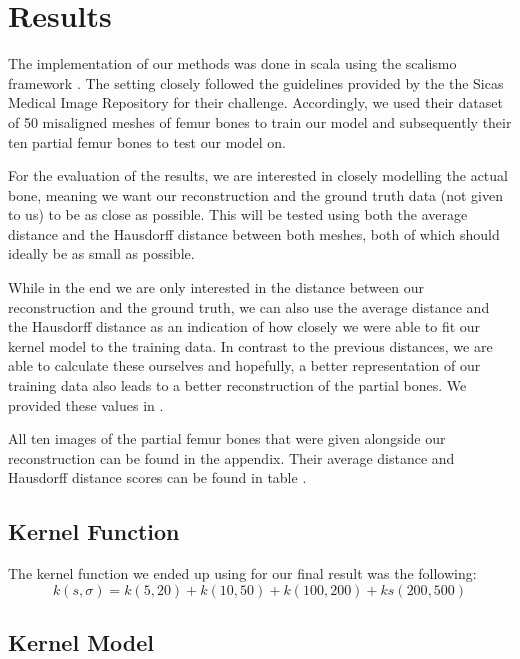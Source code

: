 \section{Results}
\label{sec:results}

The implementation of our methods was done in scala using the scalismo framework . 
The setting closely followed the guidelines provided by the the Sicas Medical Image Repository for their  challenge. 
Accordingly, we used their dataset of 50 misaligned meshes of femur bones to train our model and subsequently their ten partial femur bones to test our model on. 

For the evaluation of the results, we are interested in closely modelling the actual bone, meaning we want our reconstruction and the ground truth data (not given to us) to be as close as possible. 
This will be tested using both the average distance and the Hausdorff distance between both meshes, both of which should ideally be as small as possible.

While in the end we are only interested in the distance between our reconstruction and the ground truth, we can also use the average distance and the Hausdorff distance as an indication of how closely we were able to fit our kernel model to the training data. 
In contrast to the previous distances, we are able to calculate these ourselves and hopefully, a better representation of our training data also leads to a better reconstruction of the partial bones. 
We provided these values in .

All ten images of the partial femur bones that were given alongside our reconstruction can be found in the appendix. 
Their average distance and Hausdorff distance scores can be found in table  .

\subsection{Kernel Function}
The kernel function we ended up using for our final result was the following: 
\begin{equation}
k(s, \sigma) = k(5, 20) + k(10, 50) + k(100, 200) + ks(200, 500)
\end{equation}
\subsection{Kernel Model}

